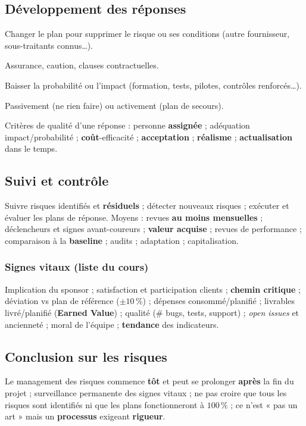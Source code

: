 \documentclass[11pt,a4paper]{article}
\begin{document}
\subsection{Développement des réponses}
\begin{description}[style=nextline]
  \item[Rejeter (\emph{éviter})] Changer le plan pour supprimer le risque ou ses conditions (autre fournisseur, sous-traitants connus\ldots).
  \item[Transférer] Assurance, caution, clauses contractuelles.
  \item[Réduire] Baisser la probabilité ou l'impact (formation, tests, pilotes, contrôles renforcés\ldots).
  \item[Accepter] Passivement (ne rien faire) ou activement (plan de secours).
\end{description}

Critères de qualité d'une réponse : personne \textbf{assignée} ; adéquation impact/probabilité ; \textbf{coût}-efficacité ; \textbf{acceptation} ; \textbf{réalisme} ; \textbf{actualisation} dans le temps.

\subsection{Suivi et contrôle}
Suivre risques identifiés et \textbf{résiduels} ; détecter nouveaux risques ; exécuter et évaluer les plans de réponse. Moyens : revues \textbf{au moins mensuelles} ; déclencheurs et signes avant-coureurs ; \textbf{valeur acquise} ; revues de performance ; comparaison à la \textbf{baseline} ; audits ; adaptation ; capitalisation.

\subsubsection{Signes vitaux (liste du cours)}
Implication du sponsor ; satisfaction et participation clients ; \textbf{chemin critique} ; déviation vs plan de référence ($\pm10\,\%$) ; dépenses consommé/planifié ; livrables livré/planifié (\textbf{Earned Value}) ; qualité (\# bugs, tests, support) ; \emph{open issues} et ancienneté ; moral de l'équipe ; \textbf{tendance} des indicateurs.

\subsection{Conclusion sur les risques}
Le management des risques commence \textbf{tôt} et peut se prolonger \textbf{après} la fin du projet ; surveillance permanente des signes vitaux ; ne pas croire que tous les risques sont identifiés ni que les plans fonctionneront à $100\,\%$ ; ce n'est « pas un art » mais un \textbf{processus} exigeant \textbf{rigueur}.
\end{document}

